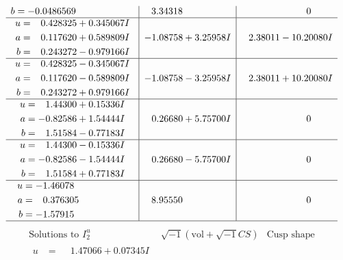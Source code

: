\documentclass[1p]{elsarticle_modified}
\theoremstyle{definition}
\newcommand{\I}{\sqrt{-1}}
\begin{document}
$$\begin{array}{c|c|c}
\begin{aligned}
b &= -0.0486569\phantom{ +0.000000I}\end{aligned}
 & \phantom{-}3.34318\phantom{ +0.000000I} & \phantom{-0.000000 } 0 \\ \hline\begin{aligned}
u &= \phantom{-}0.428325 + 0.345067 I \\
a &= \phantom{-}0.117620 + 0.589809 I \\
b &= \phantom{-}0.243272 - 0.979166 I\end{aligned}
 & -1.08758 + 3.25958 I & \phantom{-}2.38011 - 10.20080 I \\ \hline\begin{aligned}
u &= \phantom{-}0.428325 - 0.345067 I \\
a &= \phantom{-}0.117620 - 0.589809 I \\
b &= \phantom{-}0.243272 + 0.979166 I\end{aligned}
 & -1.08758 - 3.25958 I & \phantom{-}2.38011 + 10.20080 I \\ \hline\begin{aligned}
u &= \phantom{-}1.44300 + 0.15336 I \\
a &= -0.82586 + 1.54444 I \\
b &= \phantom{-}1.51584 - 0.77183 I\end{aligned}
 & \phantom{-}0.26680 + 5.75700 I & \phantom{-0.000000 } 0 \\ \hline\begin{aligned}
u &= \phantom{-}1.44300 - 0.15336 I \\
a &= -0.82586 - 1.54444 I \\
b &= \phantom{-}1.51584 + 0.77183 I\end{aligned}
 & \phantom{-}0.26680 - 5.75700 I & \phantom{-0.000000 } 0 \\ \hline\begin{aligned}
u &= -1.46078\phantom{ +0.000000I} \\
a &= \phantom{-}0.376305\phantom{ +0.000000I} \\
b &= -1.57915\phantom{ +0.000000I}\end{aligned}
 & \phantom{-}8.95550\phantom{ +0.000000I} & \phantom{-0.000000 } 0\\
 \hline 
 \end{array}$$\newpage$$\begin{array}{c|c|c}  
\text{Solutions to }I^u_{2}& \I (\text{vol} + \sqrt{-1}CS) & \text{Cusp shape}\\
 \hline 
\begin{aligned}
u &= \phantom{-}1.47066 + 0.07345 I \\

\end{aligned}
\end{array}$$
\end{document}
